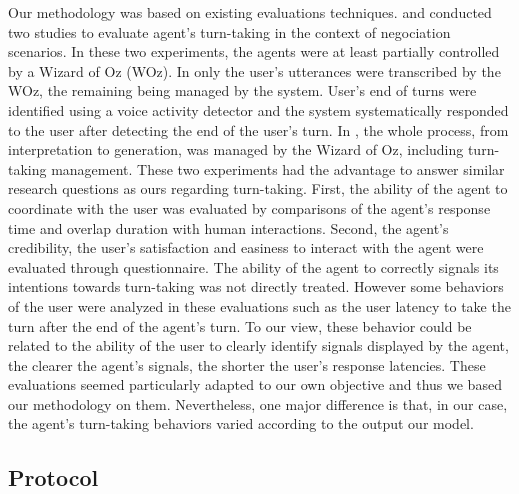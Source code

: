 Our methodology was based on existing evaluations techniques.
\cite{skantze_towards_2010} and \cite{de_vault_toward_2015} conducted two studies to evaluate agent's turn-taking in the context of negociation scenarios. In these two experiments, the agents were at least partially controlled by a Wizard of Oz (WOz). In \cite{skantze_towards_2010} only the user's utterances were transcribed by the WOz, the remaining being managed by the system. User's end of turns were identified using a voice activity detector and the system systematically responded to the user after detecting the end of the user's turn. In \cite{de_vault_toward_2015}, the whole process, from interpretation to generation, was managed by the Wizard of Oz, including turn-taking management. These two experiments had the advantage to answer similar research questions as ours regarding turn-taking. First, the ability of the agent to coordinate with the user was evaluated by comparisons of the agent's response time and overlap duration with human interactions. Second, the agent's credibility, the user's satisfaction and easiness to interact with the agent were evaluated through questionnaire. The ability of the agent to correctly signals its intentions towards turn-taking was not directly treated. However some behaviors of the user were analyzed in these evaluations such as the user latency to take the turn after the end of the agent's turn. To our view, these behavior could be related to the ability of the user to clearly identify signals displayed by the agent, the clearer the agent's signals, the shorter the user's response latencies. These evaluations seemed particularly adapted to our own objective and thus we based our methodology on them. Nevertheless, one major difference is that, in our case, the agent's turn-taking behaviors varied according to the output our model. 

\subsection{Protocol}

